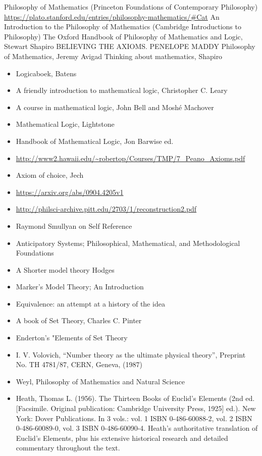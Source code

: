 \documentclass{report}
\begin{document}
Philosophy of Mathematics (Princeton Foundations of Contemporary Philosophy)
\url{https://plato.stanford.edu/entries/philosophy-mathematics/#Cat}
An Introduction to the Philosophy of Mathematics (Cambridge Introductions to Philosophy)
The Oxford Handbook of Philosophy of Mathematics and Logic, Stewart Shapiro
BELIEVING THE AXIOMS. PENELOPE MADDY
Philosophy of Mathematics, Jeremy Avigad
Thinking about mathematics, Shapiro


\begin{itemize}
\item Logicaboek, Batens
\item A friendly introduction to mathematical logic, Christopher C. Leary
\item A course in mathematical logic, John Bell and Moshé Machover
\item Mathematical Logic, Lightstone
\item Handbook of Mathematical Logic, Jon Barwise ed.
\item \url{http://www2.hawaii.edu/~robertop/Courses/TMP/7_Peano_Axioms.pdf}
\item Axiom of choice, Jech
\item \url{https://arxiv.org/abs/0904.4205v1}
\item \url{http://philsci-archive.pitt.edu/2703/1/reconstruction2.pdf}
\item Raymond Smullyan on Self Reference
\item Anticipatory Systems; Philosophical, Mathematical, and Methodological Foundations
\item A Shorter model theory Hodges
\item Marker's Model Theory; An Introduction
\item Equivalence: an attempt at a history of the idea
\item A book of Set Theory, Charles C. Pinter
\item Enderton's "Elements of Set Theory
\item I. V. Volovich, ``Number theory as the ultimate physical theory'', Preprint No. TH 4781/87, CERN, Geneva, (1987)
\item Weyl, Philosophy of Mathematics and Natural Science
\item Heath, Thomas L. (1956). The Thirteen Books of Euclid's Elements (2nd ed. [Facsimile. Original publication: Cambridge University Press, 1925] ed.). New York: Dover Publications. In 3 vols.: vol. 1 ISBN 0-486-60088-2, vol. 2 ISBN 0-486-60089-0, vol. 3 ISBN 0-486-60090-4. Heath's authoritative translation of Euclid's Elements, plus his extensive historical research and detailed commentary throughout the text.

\end{itemize}
\end{document}
